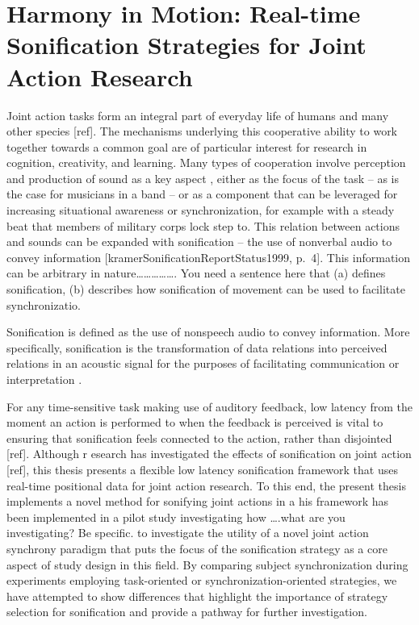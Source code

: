 \documentclass[10pt,a4paper,onecolumn]{article}
\begin{document}
\hypertarget{harmony-in-motion-real-time-sonification-strategies-for-joint-action-research}{%
\section{Harmony in Motion: Real-time Sonification Strategies for Joint Action Research}\label{harmony-in-motion-real-time-sonification-strategies-for-joint-action-research}}

Joint action tasks form an integral part of everyday life of humans and many other species {[}ref{]}. The mechanisms underlying this cooperative ability to work together towards a common goal are of particular interest for research in cognition, creativity, and learning. Many types of cooperation involve perception and production of sound as a key aspect , either as the focus of the task -- as is the case for musicians in a band -- or as a component that can be leveraged for increasing situational awareness or synchronization, for example with a steady beat that members of military corps lock step to. This relation between actions and sounds can be expanded with sonification -- the use of nonverbal audio to convey information {[}kramerSonificationReportStatus1999, p.~4{]}. This information can be arbitrary in nature\ldots\ldots\ldots\ldots\ldots. You need a sentence here that (a) defines sonification, (b) describes how sonification of movement can be used to facilitate synchronizatio.

Sonification is defined as the use of nonspeech audio to convey information. More specifically, sonification is the transformation of data relations into perceived relations in an acoustic signal for the purposes of facilitating communication or interpretation \autocite[p.~4]{kramerSonificationReportStatus1999}.

For any time-sensitive task making use of auditory feedback, low latency from the moment an action is performed to when the feedback is perceived is vital to ensuring that sonification feels connected to the action, rather than disjointed {[}ref{]}. Although r esearch has investigated the effects of sonification on joint action {[}ref{]}, this thesis presents a flexible low latency sonification framework that uses real-time positional data for joint action research. To this end, the present thesis implements a novel method for sonifying joint actions in a his framework has been implemented in a pilot study investigating how \ldots.what are you investigating? Be specific. to investigate the utility of a novel joint action synchrony paradigm that puts the focus of the sonification strategy as a core aspect of study design in this field. By comparing subject synchronization during experiments employing task-oriented or synchronization-oriented strategies, we have attempted to show differences that highlight the importance of strategy selection for sonification and provide a pathway for further investigation.
\end{document}
